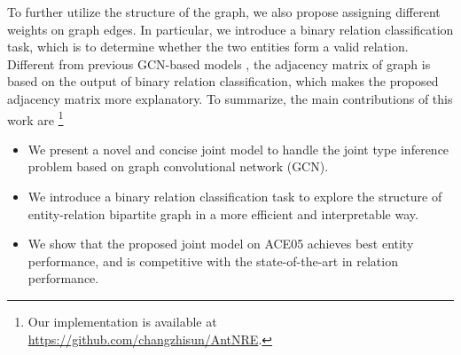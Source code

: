 To further utilize the structure of the graph,
we also propose assigning different weights on graph edges.
In particular,
we introduce a binary relation classification task,
which is to determine whether the two entities form a valid relation.
Different from previous GCN-based models \cite{shang2018end,zhang2018graph},
the adjacency matrix of graph is based on the output of binary relation classification,
which makes the proposed adjacency matrix  more explanatory.
To summarize,
the main contributions of this work are
\footnote{ Our implementation is available at  \url{https://github.com/changzhisun/AntNRE}.}
\begin{itemize}[leftmargin=*]
    \item We present a novel and concise joint model to handle the joint type inference problem based on graph convolutional network (GCN).
    \item We introduce a binary relation classification task to explore the structure of entity-relation bipartite graph in a more efficient and interpretable way.
    \item We show that the proposed joint model on ACE05
    achieves best entity performance, and is competitive with the state-of-the-art in relation performance.
    
\end{itemize}
